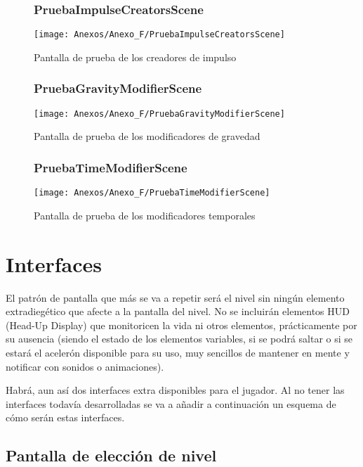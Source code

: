 \begin{figure}[h]
\subsubsection{PruebaImpulseCreatorsScene}
\centering
\texttt{[image: Anexos/Anexo\_F/PruebaImpulseCreatorsScene]}
\caption{Pantalla de prueba de los creadores de impulso }
\end{figure}

\begin{figure}[h]
\subsubsection{PruebaGravityModifierScene}
\centering
\texttt{[image: Anexos/Anexo\_F/PruebaGravityModifierScene]}
\caption{Pantalla de prueba de los modificadores de gravedad }
\end{figure}
\clearpage

\begin{figure}[h]
\subsubsection{PruebaTimeModifierScene}
\centering
\texttt{[image: Anexos/Anexo\_F/PruebaTimeModifierScene]}
\caption{Pantalla de prueba de los modificadores temporales}
\end{figure}

\section{Interfaces}
El patrón de pantalla que más se va a repetir será el nivel sin ningún elemento extradiegético que afecte a la pantalla del nivel. No se incluirán elementos HUD (Head-Up Display) que monitoricen la vida ni otros elementos, prácticamente por su ausencia (siendo el estado de los elementos variables, si se podrá saltar o si se estará el acelerón disponible para su uso, muy sencillos de mantener en mente y notificar con sonidos o animaciones).

Habrá, aun así dos interfaces extra disponibles para el jugador. Al no tener las interfaces todavía desarrolladas se va a añadir a continuación un esquema de cómo serán estas interfaces.

\subsection{Pantalla de elección de nivel}

